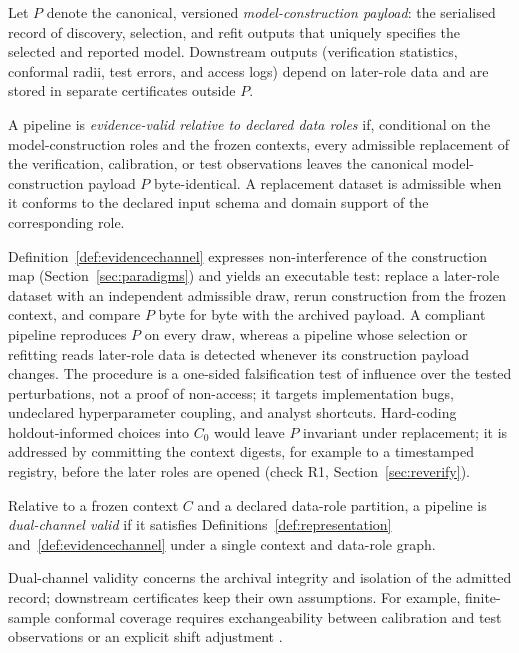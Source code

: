 Let \(P\) denote the canonical, versioned \emph{model-construction payload}: the serialised record of discovery, selection, and refit outputs that uniquely specifies the selected and reported model. Downstream outputs (verification statistics, conformal radii, test errors, and access logs) depend on later-role data and are stored in separate certificates outside \(P\).

\begingroup\sloppy
\begin{definition}\label{def:evidencechannel}
A pipeline is \emph{evidence-valid relative to declared data roles} if, conditional on the model-construction roles and the frozen contexts, every admissible replacement of the verification, calibration, or test observations leaves the canonical model-construction payload \(P\) byte-identical. A replacement dataset is admissible when it conforms to the declared input schema and domain support of the corresponding role.
\end{definition}
\endgroup

Definition~\ref{def:evidencechannel} expresses non-interference of the construction map (Section~\ref{sec:paradigms}) and yields an executable test: replace a later-role dataset with an independent admissible draw, rerun construction from the frozen context, and compare \(P\) byte for byte with the archived payload. A compliant pipeline reproduces \(P\) on every draw, whereas a pipeline whose selection or refitting reads later-role data is detected whenever its construction payload changes. The procedure is a one-sided falsification test of influence over the tested perturbations, not a proof of non-access; it targets implementation bugs, undeclared hyperparameter coupling, and analyst shortcuts. Hard-coding holdout-informed choices into \(C_0\) would leave \(P\) invariant under replacement; it is addressed by committing the context digests, for example to a timestamped registry, before the later roles are opened (check R1, Section~\ref{sec:reverify}).

\begin{definition}\label{def:dual}
Relative to a frozen context \(C\) and a declared data-role partition, a pipeline is \emph{dual-channel valid} if it satisfies Definitions~\ref{def:representation} and~\ref{def:evidencechannel} under a single context and data-role graph.
\end{definition}

Dual-channel validity concerns the archival integrity and isolation of the admitted record; downstream certificates keep their own assumptions. For example, finite-sample conformal coverage requires exchangeability between calibration and test observations or an explicit shift adjustment \citep{lei2018conformal,barber2023exchangeability}.

